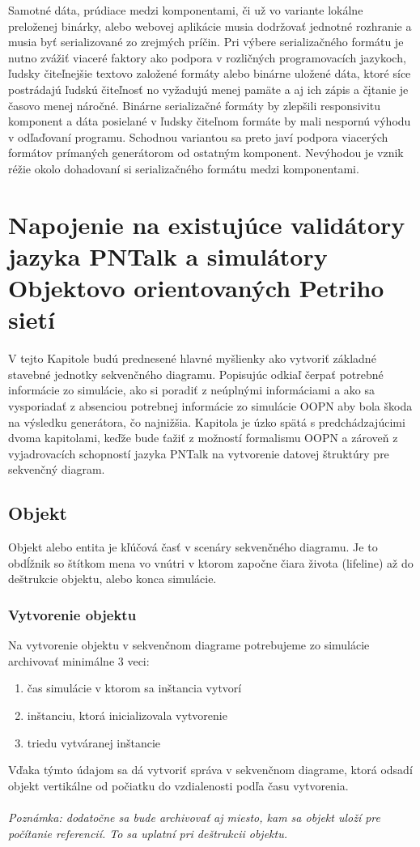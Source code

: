 Samotné dáta, prúdiace medzi komponentami, či už vo variante lokálne preloženej binárky, alebo webovej aplikácie musia dodržovať jednotné rozhranie a musia byť serializované zo zrejmých príčin. Pri výbere serializačného formátu je nutno zvážiť viaceré faktory ako podpora v rozličných programovacích jazykoch, ľudsky čiteľnejšie textovo založené formáty alebo binárne uložené dáta, ktoré síce postrádajú ľudskú čiteľnosť no vyžadujú menej pamäte a aj ich zápis a čįtanie je časovo menej náročné. Binárne serializačné formáty by zlepšili responsivitu komponent a dáta posielané v ľudsky čiteľnom formáte by mali nespornú výhodu v odľaďovaní programu. Schodnou variantou sa preto javí podpora viacerých formátov prímaných generátorom od ostatným komponent. Nevýhodou je vznik réžie okolo dohadovaní si serializačného formátu medzi komponentami.

\section{Napojenie na existujúce validátory jazyka PNTalk a simulátory Objektovo orientovaných Petriho sietí}



V tejto Kapitole budú prednesené hlavné myšlienky ako vytvoriť základné stavebné jednotky sekvenčného diagramu. Popisujúc odkiaľ čerpať potrebné informácie zo simulácie, ako si poradiť z neúplnými informáciami a ako sa vysporiadať z absenciou potrebnej informácie zo simulácie OOPN aby bola škoda na výsledku generátora, čo najnižšia. Kapitola je úzko spätá s predchádzajúcimi dvoma kapitolami, keďže bude ťažiť z možností formalismu OOPN a zároveň z vyjadrovacích schopností jazyka PNTalk na vytvorenie datovej štruktúry pre sekvenčný diagram.

\subsection*{Objekt}
Objekt alebo entita je kľúčová časť v scenáry sekvenčného diagramu. Je to obdĺžnik so štítkom mena vo vnútri v ktorom započne čiara života (lifeline) až do deštrukcie objektu, alebo konca simulácie.

\subsubsection*{Vytvorenie objektu}
Na vytvorenie objektu v sekvenčnom diagrame potrebujeme zo simulácie archivovať minimálne 3 veci:

\begin{enumerate}
	\item čas simulácie v ktorom sa inštancia vytvorí
	\item inštanciu, ktorá inicializovala vytvorenie
	\item triedu vytváranej inštancie
\end{enumerate}
Vďaka týmto údajom sa dá vytvoriť správa v sekvenčnom diagrame, ktorá odsadí objekt vertikálne od počiatku do vzdialenosti podľa času vytvorenia.\\\\
\textit{Poznámka: dodatočne sa bude archivovať aj miesto, kam sa objekt uloží pre počítanie referencií. To sa uplatní pri deštrukcii objektu.}


